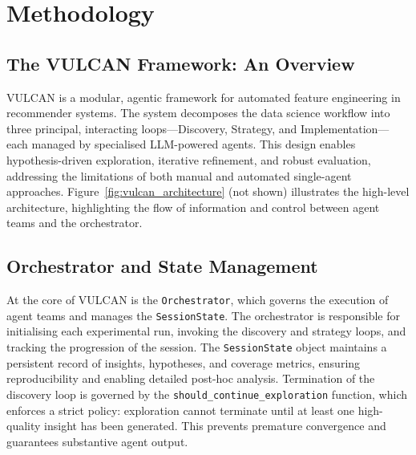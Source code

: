 \doublespacing %

\chapter{Methodology}
\label{ch2}

\begin{spacing}{1}
\minitoc
\end{spacing}
\thesisspacing

\section{The VULCAN Framework: An Overview}
VULCAN is a modular, agentic framework for automated feature engineering in recommender systems. The system decomposes the data science workflow into three principal, interacting loops—Discovery, Strategy, and Implementation—each managed by specialised LLM-powered agents. This design enables hypothesis-driven exploration, iterative refinement, and robust evaluation, addressing the limitations of both manual and automated single-agent approaches. Figure~\ref{fig:vulcan_architecture} (not shown) illustrates the high-level architecture, highlighting the flow of information and control between agent teams and the orchestrator.

\section{Orchestrator and State Management}
At the core of VULCAN is the \texttt{Orchestrator}, which governs the execution of agent teams and manages the \texttt{SessionState}. The orchestrator is responsible for initialising each experimental run, invoking the discovery and strategy loops, and tracking the progression of the session. The \texttt{SessionState} object maintains a persistent record of insights, hypotheses, and coverage metrics, ensuring reproducibility and enabling detailed post-hoc analysis. Termination of the discovery loop is governed by the \texttt{should\_continue\_exploration} function, which enforces a strict policy: exploration cannot terminate until at least one high-quality insight has been generated. This prevents premature convergence and guarantees substantive agent output.

